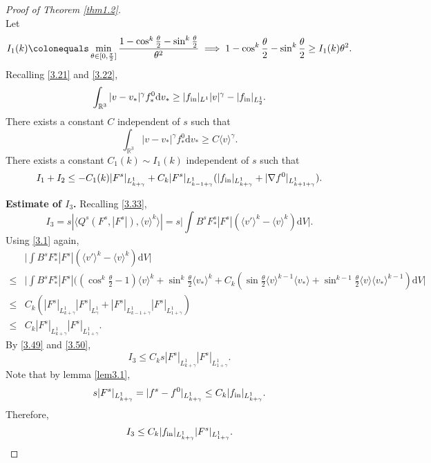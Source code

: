\documentclass[reqno,10pt]{amsart}
\def\grad{\nabla}
\def\th{\theta}
\newcommand{\beq}{\begin{equation}}
\newcommand{\eeq}{\end{equation}}
\newcommand{\ben}{\begin{eqnarray}}
\newcommand{\een}{\end{eqnarray}}
\theoremstyle{definition}
\numberwithin{equation}{section}
\begin{document}
\begin{proof}[Proof of Theorem \ref{thm1.2}]
$$$$
Let $$
I_1(k)\colonequals\min\limits_{\th\in[0,\frac{\pi}{2}]}\frac{1-\cos^k\frac{\th}{2}-\sin^k\frac{\th}{2}}{ \th^2}\implies 1-\cos^k\frac{\th}{2}-\sin^k\frac{\th}{2}\ge I_1(k)\th^2.
$$
Recalling \eqref{3.21} and \eqref{3.22},
$$\int_{\mathbb{R}^3}|v-v_*|^{\gamma}f^0_*\mathrm{d}v_*\ge |f_{\textup{in}}|_{L^1}|v|^{\gamma}-|f_{\textup{in}}|_{L^1_2}.$$
There exists a constant $C$ independent of $s$ such that
$$\int_{\mathbb{R}^3}|v-v_*|^{\gamma}f^0_*\mathrm{d}v_*\ge C\langle v\rangle^\gamma.$$
There exists a constant $C_1(k)\sim I_1(k)$ independent of $s$ such that
\ben\label{3.48}
I_1+I_2\le -C_1(k)|F^s|_{L^1_{k+\gamma}}+C_k|F^s|_{L^1_{k-1+\gamma}}(|f_{\textup{in}}|_{L^1_{k+\gamma}}+|\grad f^0|_{L^1_{k+1+\gamma}}).
\een

\textbf{Estimate of $I_3$.} Recalling \eqref{3.33},
\beq\label{3.49}
    I_3=s|\langle Q^s(F^s,|F^s|),\langle v\rangle^k\rangle|=s\Bigg|\int B^s F^s_*|F^s|(\langle v'\rangle^k- \langle v\rangle^k)\mathrm{d}V\Bigg|.
\eeq
Using \eqref{3.1} again,
\beq\label{3.50}
\begin{aligned}
    &\Bigg|\int B^s F^s_*|F^s|(\langle v'\rangle^k- \langle v\rangle^k)\mathrm{d}V\Bigg|\\
    \le & \Bigg|\int B^sF^s_*|F^s|((\cos^k\frac{\th}{2}-1)\langle v\rangle^k+\sin^k\frac{\th}{2}\langle v_*\rangle^k+C_k(\sin\frac{\th}{2}\langle v\rangle^{k-1}\langle v_*\rangle+\sin^{k-1}\frac{\th}{2}\langle v\rangle\langle v_*\rangle^{k-1})\mathrm{d}V\Bigg|\\
    \le & C_k(|F^s|_{L^1_{k+\gamma}}|F^s|_{L^1_\gamma}+|F^s|_{L^1_{k-1+\gamma}}|F^s|_{L^1_{1+\gamma}})\\
    \le& C_k|F^s|_{L^1_{k+\gamma}}|F^s|_{L^1_{1+\gamma}}.
\end{aligned}
\eeq
By \eqref{3.49} and \eqref{3.50},
$$
I_3\le C_ks|F^s|_{L^1_{k+\gamma}}|F^s|_{L^1_{1+\gamma}}.
$$
Note that by lemma \ref{lem3.1},
$$s|F^s|_{L^1_{k+\gamma}}=|f^s-f^0|_{L^1_{k+\gamma}}\le C_k|f_{\textup{in}}|_{L^1_{k+\gamma}}.$$
Therefore,
\ben\label{3.51}
I_3\le C_k|f_{\textup{in}}|_{L^1_{k+\gamma}}|F^s|_{L^1_{1+\gamma}}.
\een


\end{proof}
\end{document}
